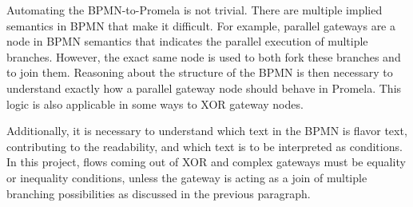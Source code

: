 
Automating the BPMN-to-Promela is not trivial. There are multiple implied semantics in BPMN that make it difficult. For example, parallel gateways are a node in BPMN semantics that indicates the parallel execution of multiple branches. However, the exact same node is used to both fork these branches and to join them. Reasoning about the structure of the BPMN is then necessary to understand exactly how a parallel gateway node should behave in Promela. This logic is also applicable in some ways to XOR gateway nodes.

Additionally, it is necessary to understand which text in the BPMN is flavor text, contributing to the readability, and which text is to be interpreted as conditions. In this project, flows coming out of XOR and complex gateways must be equality or inequality conditions, unless the gateway is acting as a join of multiple branching possibilities as discussed in the previous paragraph.
